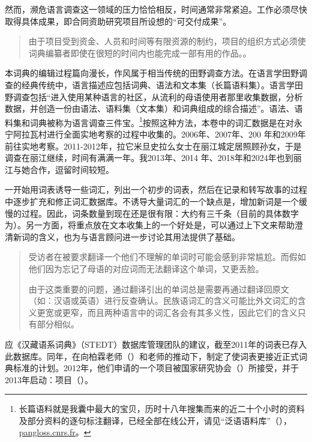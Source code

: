 然而，濒危语言调查这一领域的压力恰恰相反，时间通常非常紧迫。工作必须尽快取得具体成果，即合同资助研究项目所设想的“可交付成果”。
\begin{quotation}
    由于项目受到资金、人员和时间等有限资源的制约，项目的组织方式必须使词典编纂者即使在很短的时间内也能完成一部有用的作品。\parencite[“濒危语言社区的词典编纂”:][42]{mosel_dictionary_2004}。
\end{quotation}

本词典的编辑过程篇向漫长，作风属于相当传统的田野调查方法。在语言学田野调查的经典传统中，语言描述应包括词典、语法和文本集（长篇语料集）\parencite{michaud2012_yongning}。语言学田野调查包括“进入使用某种语言的社区，从流利的母语使用者那里收集数据，分析数据，并创造一份由语法、语料集（文本集）和词典组成的综合描述”\parencite[12]{dixon2007}。语法、语料集和词典被称为语言调查三件宝\parencite{sun2007}。\footnote{长篇语料就是我囊中最大的宝贝，历时十八年搜集而来的近二十个小时的资料及部分资料的逐句标注翻译，已经全部在线公开，请见“泛语语料库”（），\href{https://pangloss.cnrs.fr/}{pangloss.cnrs.fr}。}按照这种方法，本卷中的词汇数据是在对永宁阿拉瓦村进行全面实地考察的过程中收集的。2006年、2007年、200 年和2009年前往实地考察。2011-2012年，拉它米旦史拉么女士在丽江城定居照顾孙女，于是调查在丽江继续，时间有满满一年。我2013年、2014 年、2018年和2024年也到丽江与她合作，逗留时间较短。

一开始用词表诱导一些词汇，列出一个初步的词表，然后在记录和转写故事的过程中逐步扩充和修正词汇数据库。不诱导大量词汇的一个缺点是，增加新词是一个缓慢的过程。因此，词条数量到现在还是很有限：大约有三千条（目前的具体数字为）。另一方面，将重点放在文本收集上的一个好处是，可以通过上下文来帮助澄清新词的含义，也为与语言顾问进一步讨论其用法提供了基础。

\begin{quotation}
    受访者在被要求翻译一个他们不理解的单词时可能会感到非常尴尬。而假如他们因为忘记了母语的对应词而无法翻译这个单词，又更丢脸。

    由于这类重要的问题，通过翻译引出的单词总是需要再通过翻译回原文（如：汉语或英语）进行反查确认。民族语词汇的含义可能比外文词汇的含义更宽或更窄，而且两种语言中的词汇各会有其多义性，因此它们的含义只有部分相似。\parencite[44]{mosel_dictionary_2004}
\end{quotation}

应《汉藏语系词典》（STEDT）数据库管理团队的建议，截至2011年的词表已存入此数据库\parencite{stedt}。同年，在向柏霖老师（）和老师的推动下，制定了使词表更接近正式词典标准的计划。2012年，他们申请的一个项目被国家研究协会（）所接受，并于2013年启动：项目（）。

